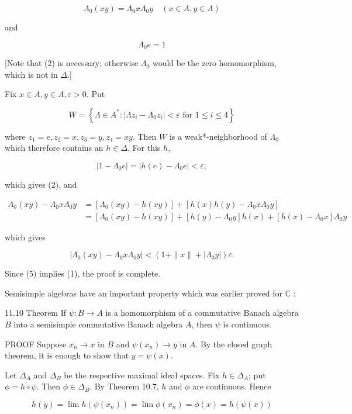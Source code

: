 \documentclass[10pt]{article}
\begin{document}
$$
\Lambda_{0}(x y)=\Lambda_{0} x \Lambda_{0} y \quad(x \in A, y \in A)
$$

and

$$
\Lambda_{0} e=1
$$

[Note that (2) is necessary; otherwise $\Lambda_{0}$ would be the zero homomorphism, which is not in $\Delta$.]

Fix $x \in A, y \in A, \varepsilon>0$. Put

$$
W=\left\{\Lambda \in A^{*}:\left|\Lambda z_{i}-\Lambda_{0} z_{i}\right|<\varepsilon \text { for } 1 \leq i \leq 4\right\}
$$

where $z_{1}=e, z_{2}=x, z_{3}=y, z_{4}=x y$. Then $W$ is a weak*-neighborhood of $\Lambda_{0}$ which therefore contains an $h \in \Delta$. For this $h$,

$$
\left|1-\Lambda_{0} e\right|=\left|h(e)-\Lambda_{0} e\right|<\varepsilon,
$$

which gives (2), and

$$
\begin{aligned}
\Lambda_{0}(x y)-\Lambda_{0} x \Lambda_{0} y & =\left[\Lambda_{0}(x y)-h(x y)\right]+\left[h(x) h(y)-\Lambda_{0} x \Lambda_{0} y\right] \\
& =\left[\Lambda_{0}(x y)-h(x y)\right]+\left[h(y)-\Lambda_{0} y\right] h(x)+\left[h(x)-\Lambda_{0} x\right] \Lambda_{0} y
\end{aligned}
$$

which gives

$$
\left|\Lambda_{0}(x y)-\Lambda_{0} x \Lambda_{0} y\right|<\left(1+\|x\|+\left|\Lambda_{0} y\right|\right) \varepsilon .
$$

Since (5) implies (1), the proof is complete.

Semisimple algebras have an important property which was earlier proved for $\mathbb{C}$ :

11.10 Theorem If $\psi: B \rightarrow A$ is a homomorphism of a commutative Banach algebra $B$ into a semisimple commutative Banach algebra $A$, then $\psi$ is continuous.

PROOF Suppose $x_{n} \rightarrow x$ in $B$ and $\psi\left(x_{n}\right) \rightarrow y$ in $A$. By the closed graph theorem, it is enough to show that $y=\psi(x)$.

Let $\Delta_{A}$ and $\Delta_{B}$ be the respective maximal ideal spaces. Fix $h \in \Delta_{A}$; put $\phi=h \circ \psi$. Then $\phi \in \Delta_{B}$. By Theorem 10.7, $h$ and $\phi$ are continuous. Hence

$$
h(y)=\lim h\left(\psi\left(x_{n}\right)\right)=\lim \phi\left(x_{n}\right)=\phi(x)=h(\psi(x))
$$
\end{document}
